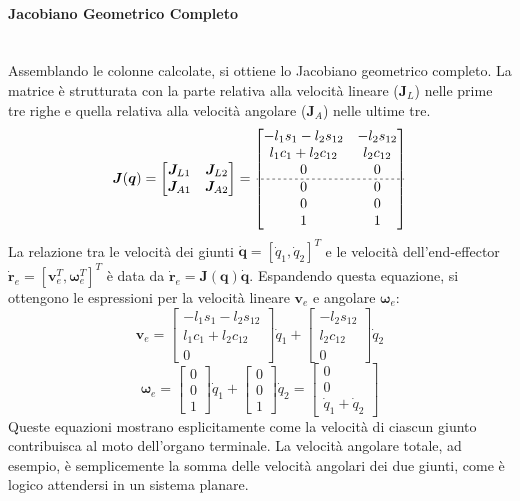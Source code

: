 ﻿\documentclass[11pt, a4paper]{article}
\begin{document}
\paragraph{Jacobiano Geometrico Completo}\(\mbox{}\)\\
Assemblando le colonne calcolate, si ottiene lo Jacobiano geometrico completo. La matrice è strutturata con la parte relativa alla velocità lineare (\(\bm{J}_L\)) nelle prime tre righe e quella relativa alla velocità angolare (\(\bm{J}_A\)) nelle ultime tre.
\[
    \bm{J}(\bm{q}) =
    \begin{bmatrix}
        \bm{J}_{L1} & \bm{J}_{L2} \\
        \bm{J}_{A1} & \bm{J}_{A2}
    \end{bmatrix}
    =
    \begin{bmatrix}
        -l_1 s_1 - l_2 s_{12} & -l_2 s_{12} \\
        l_1 c_1 + l_2 c_{12} & l_2 c_{12} \\
        0 & 0 \\
        \hdashline[2pt/2pt]
        0 & 0 \\
        0 & 0 \\
        1 & 1
    \end{bmatrix}
\]
La relazione tra le velocità dei giunti \(\dot{\bm{q}} = [\dot{q}_1, \dot{q}_2]^T\) e le velocità dell'end-effector \(\bm{\dot{r}}_e = [\bm{v}_e^T, \bm{\omega}_e^T]^T\) è data da \(\bm{\dot{r}}_e = \bm{J}(\bm{q})\dot{\bm{q}}\). Espandendo questa equazione, si ottengono le espressioni per la velocità lineare \(\bm{v}_e\) e angolare \(\bm{\omega}_e\):
\[
    \bm{v}_e =
    \begin{bmatrix} -l_1 s_1 - l_2 s_{12} \\ l_1 c_1 + l_2 c_{12} \\ 0 \end{bmatrix} \dot{q}_1
    +
    \begin{bmatrix} -l_2 s_{12} \\ l_2 c_{12} \\ 0 \end{bmatrix} \dot{q}_2
\]
\[
    \bm{\omega}_e =
    \begin{bmatrix} 0 \\ 0 \\ 1 \end{bmatrix} \dot{q}_1
    +
    \begin{bmatrix} 0 \\ 0 \\ 1 \end{bmatrix} \dot{q}_2
    = \begin{bmatrix} 0 \\ 0 \\ \dot{q}_1 + \dot{q}_2 \end{bmatrix}
\]
Queste equazioni mostrano esplicitamente come la velocità di ciascun giunto contribuisca al moto dell'organo terminale. La velocità angolare totale, ad esempio, è semplicemente la somma delle velocità angolari dei due giunti, come è logico attendersi in un sistema planare.
\end{document}
